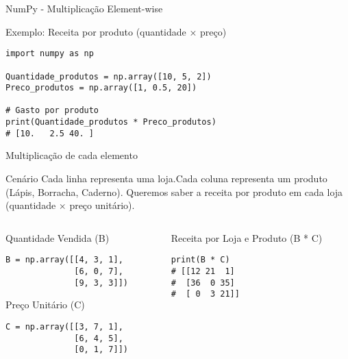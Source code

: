 \begin{frame}[fragile]{NumPy - Multiplicação Element-wise}
    \begin{block}{Exemplo: Receita por produto (quantidade × preço)}
        \begin{verbatim}
import numpy as np

Quantidade_produtos = np.array([10, 5, 2])
Preco_produtos = np.array([1, 0.5, 20])        

# Gasto por produto
print(Quantidade_produtos * Preco_produtos)
# [10.   2.5 40. ]
\end{verbatim}
    \end{block}
\end{frame}


\begin{frame}[fragile]{Multiplicação de cada elemento}

    \begin{block}{Cenário}
        Cada linha representa uma loja.Cada coluna representa um produto (Lápis, Borracha, Caderno).
        Queremos saber a receita por produto em cada loja (quantidade $\times$ preço unitário).
    \end{block}

    \begin{columns}
        \begin{column}{0.5\textwidth}
            \begin{block}{Quantidade Vendida (B)}
                \begin{verbatim}
B = np.array([[4, 3, 1],
              [6, 0, 7],
              [9, 3, 3]])
\end{verbatim}
            \end{block}

            \begin{block}{Preço Unitário (C)}
                \begin{verbatim}
C = np.array([[3, 7, 1],
              [6, 4, 5],
              [0, 1, 7]])
\end{verbatim}
            \end{block}
        \end{column}

        \begin{column}{0.5\textwidth}
            \begin{exampleblock}{Receita por Loja e Produto (B * C)}
                \begin{verbatim}
print(B * C)
# [[12 21  1]
#  [36  0 35]
#  [ 0  3 21]]
\end{verbatim}
            \end{exampleblock}
        \end{column}
    \end{columns}

\end{frame}


